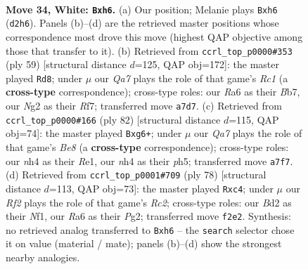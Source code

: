 \documentclass[11pt]{article}
\begin{document}
\clearpage

\begin{figure}[p]\centering
\begin{subfigure}{0.46\textwidth}\centering
\resizebox{\linewidth}{!}{%
\newchessgame
\chessboard[
  setfen={nr4k1/Q4pb1/R6p/4p3/4P2n/1r3Pq1/1P1B1RN1/1N4K1 w - - 1 34},
  showmover=false,
  pgfstyle=straightmove, color=movearrow, markmove={d2-h6}
]}
\caption{}
\end{subfigure}\hfill
\begin{subfigure}{0.46\textwidth}\centering
\resizebox{\linewidth}{!}{%
\newchessgame
\chessboard[
  setfen={2r1k3/1b3rB1/4p1Qp/p4p1P/1b3R2/1qNP4/1PRK4/8 b - - 3 30},
  showmover=false,
  pgfstyle=straightmove, color=movearrow, markmove={c8-d8}
]}
\caption{}
\end{subfigure}
\\[4pt]
\begin{subfigure}{0.46\textwidth}\centering
\resizebox{\linewidth}{!}{%
\newchessgame
\chessboard[
  setfen={R3B3/6pk/1p1b1rb1/3P2qp/8/2Qn1PN1/6KP/4R3 w - - 8 42},
  showmover=false,
  pgfstyle=straightmove, color=movearrow, markmove={e8-g6}
]}
\caption{}
\end{subfigure}\hfill
\begin{subfigure}{0.46\textwidth}\centering
\resizebox{\linewidth}{!}{%
\newchessgame
\chessboard[
  setfen={2r3k1/6p1/nr3b2/Pp5p/1PqN4/3n3P/2R1Q1P1/5NK1 w - - 0 40},
  showmover=false,
  pgfstyle=straightmove, color=movearrow, markmove={c2-c4}
]}
\caption{}
\end{subfigure}
\caption{\textbf{Move 34, White: \texttt{Bxh6}.} (a) Our position; Melanie plays \texttt{Bxh6} (\texttt{d2h6}). Panels (b)--(d) are the retrieved master positions whose correspondence most drove this move (highest QAP objective among those that transfer to it). (b) Retrieved from \texttt{ccrl\_top\_p0000\#353} (ply 59) [structural distance $d$=125, QAP obj=172]: the master played \texttt{Rd8}; under $\mu$ our \emph{Qa7} plays the role of that game's \emph{Rc1} (a \textbf{cross-type} correspondence); cross-type roles: our \emph{R}a6 as their \emph{B}b7, our \emph{N}g2 as their \emph{R}f7; transferred move \texttt{a7d7}. (c) Retrieved from \texttt{ccrl\_top\_p0000\#166} (ply 82) [structural distance $d$=115, QAP obj=74]: the master played \texttt{Bxg6+}; under $\mu$ our \emph{Qa7} plays the role of that game's \emph{Be8} (a \textbf{cross-type} correspondence); cross-type roles: our \emph{n}h4 as their \emph{R}e1, our \emph{n}h4 as their \emph{p}h5; transferred move \texttt{a7f7}. (d) Retrieved from \texttt{ccrl\_top\_p0001\#709} (ply 78) [structural distance $d$=113, QAP obj=73]: the master played \texttt{Rxc4}; under $\mu$ our \emph{Rf2} plays the role of that game's \emph{Rc2}; cross-type roles: our \emph{B}d2 as their \emph{N}f1, our \emph{R}a6 as their \emph{P}g2; transferred move \texttt{f2e2}. Synthesis: no retrieved analog transferred to \texttt{Bxh6} -- the \texttt{search} selector chose it on value (material / mate); panels (b)--(d) show the strongest nearby analogies.}
\label{fig:thought-m66}
\end{figure}
\end{document}
